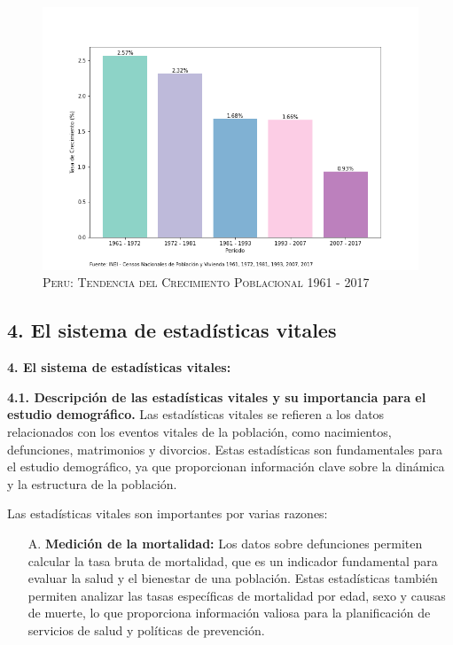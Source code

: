 \documentclass[8pt,a4paper]{beamer}
\begin{document}
{\begin{frame}{ }
\begin{figure}[hbtp]
\centering
\includegraphics[scale=0.35]{tasas_crecimiento.png}
\caption{\textsc{Peru: Tendencia del Crecimiento Poblacional 1961 - 2017}}
\label{fig:1}
\end{figure}

\end{frame}


\subsection{4. El sistema de estadísticas vitales}
\begin{frame}{\textbf{4. El sistema de estadísticas vitales:}}
\justifying
\begin{block}{\textbf{4.1. Descripción de las estadísticas vitales y su importancia para el estudio demográfico.}}
\justifying
Las estadísticas vitales se refieren a los datos relacionados con los eventos vitales de la población, como nacimientos, defunciones, matrimonios y divorcios. Estas estadísticas son fundamentales para el estudio demográfico, ya que proporcionan información clave sobre la dinámica y la estructura de la población.

Las estadísticas vitales son importantes por varias razones:
\begin{enumerate}
\justifying
\item[A.] \textbf{Medición de la mortalidad:} Los datos sobre defunciones permiten calcular la tasa bruta de mortalidad, que es un indicador fundamental para evaluar la salud y el bienestar de una población. Estas estadísticas también permiten analizar las tasas específicas de mortalidad por edad, sexo y causas de muerte, lo que proporciona información valiosa para la planificación de servicios de salud y políticas de prevención.


\end{enumerate}
\end{block}
\end{frame}}
\end{document}

